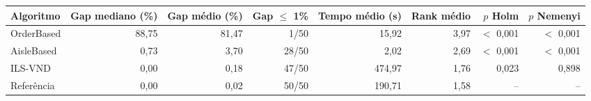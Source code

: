 \small
\begin{tabular}{lrrrrrrr}
\toprule
Algoritmo & Gap mediano (\%) & Gap médio (\%) & Gap $\leq$ 1\% & Tempo médio (s) & Rank médio & $p$ Holm & $p$ Nemenyi \\
\midrule
OrderBased & 88,75 & 81,47 & 1/50 & 15,92 & 3,97 & $<$ 0,001 & $<$ 0,001 \\
AisleBased & 0,73 & 3,70 & 28/50 & 2,02 & 2,69 & $<$ 0,001 & $<$ 0,001 \\
ILS-VND & 0,00 & 0,18 & 47/50 & 474,97 & 1,76 & 0,023 & 0,898 \\
Referência & 0,00 & 0,02 & 50/50 & 190,71 & 1,58 & -- & -- \\
\bottomrule
\end{tabular}

